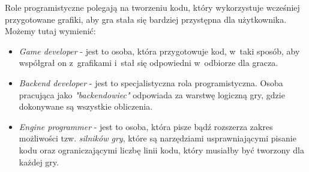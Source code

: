 \documentclass[12pt,a4paper,oneside]{book}
\theoremstyle{definition}
\numberwithin{equation}{chapter}
\begin{document}
\par Role programistyczne polegają na tworzeniu kodu, który wykorzystuje wcześniej przygotowane grafiki, aby gra stała się bardziej przystępna dla użytkownika. Możemy tutaj wymienić:
\begin{itemize}
    \item \textit{Game developer} - jest to osoba, która przygotowuje kod, w~taki sposób, aby współgrał on z~grafikami i~stał się odpowiedni w~odbiorze dla gracza.
    \item \textit{Backend developer} - jest to specjalistyczna rola programistyczna. Osoba pracująca jako \textit{"backendowiec"} odpowiada za warstwę logiczną gry, gdzie dokonywane są wszystkie obliczenia.
    \item \textit{Engine programmer} - jest to osoba, która pisze bądź rozszerza zakres możliwości tzw. \textit{silników gry}, które są narzędziami usprawniającymi pisanie kodu oraz ograniczającymi liczbę linii kodu, który musiałby być tworzony dla każdej gry. 
\end{itemize}
\end{document}
